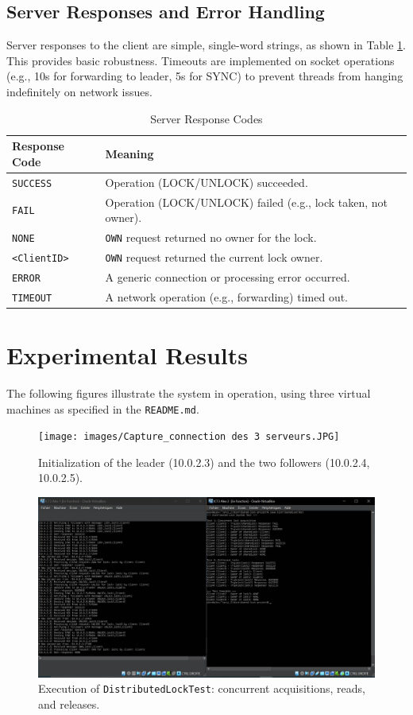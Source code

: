 \documentclass[a4paper,11pt]{article}
\begin{document}
\subsection*{Server Responses and Error Handling}
Server responses to the client are simple, single-word strings, as shown in Table \ref{tab:responses}. This provides basic robustness. Timeouts are implemented on socket operations (e.g., 10s for forwarding to leader, 5s for SYNC) to prevent threads from hanging indefinitely on network issues.

\begin{table}[htbp]
\centering
\caption{Server Response Codes}
\label{tab:responses}
\begin{tabular}{@{}ll@{}}
\toprule
\textbf{Response Code} & \textbf{Meaning} \\
\midrule
\texttt{SUCCESS} & Operation (LOCK/UNLOCK) succeeded. \\
\texttt{FAIL} & Operation (LOCK/UNLOCK) failed (e.g., lock taken, not owner). \\
\texttt{NONE} & \texttt{OWN} request returned no owner for the lock. \\
\texttt{<ClientID>} & \texttt{OWN} request returned the current lock owner. \\
\texttt{ERROR} & A generic connection or processing error occurred. \\
\texttt{TIMEOUT} & A network operation (e.g., forwarding) timed out. \\
\bottomrule
\end{tabular}
\end{table}

\section{Experimental Results}
The following figures illustrate the system in operation, using three virtual machines as specified in the \texttt{README.md}.

\begin{figure}[H]
\centering
\texttt{[image: images/Capture\_connection des 3 serveurs.JPG]}
\caption{Initialization of the leader (10.0.2.3) and the two followers (10.0.2.4, 10.0.2.5).}
\end{figure}

\begin{figure}[H]
\centering
\includegraphics[width=0.9\linewidth]{images/Capture_distributed_lock_test.JPG}
\caption{Execution of \texttt{DistributedLockTest}: concurrent acquisitions, reads, and releases.}
\end{figure}
\end{document}
